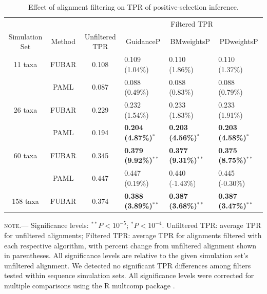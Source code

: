 \documentclass[11pt]{article}
\begin{document}
\begin{table}
\caption {\label{tab:casemodel} Effect of alignment filtering on TPR of positive-selection inference.}
\begin{tabular}{c c c l l l}
\hline\noalign{\smallskip}
& & & \multicolumn{3}{c}{Filtered TPR} \\
\cline{4-6}\noalign{\smallskip}
Simulation Set & Method & Unfiltered TPR & \multicolumn{1}{c}{GuidanceP} & \multicolumn{1}{c}{BMweightsP} & \multicolumn{1}{c}{PDweightsP} \\ 
\hline\noalign{\smallskip}
11 taxa  & FUBAR & 0.108 & 0.109  (1.04\%)   & 0.110  (1.86\%)  & 0.110  (1.37\%)        \\
              & PAML &  0.087 & 0.088  (0.49\%) &  0.088  (0.83\%)   & 0.088  (0.79\%)        \\
\hline
26 taxa   & FUBAR &  0.229 & 0.232 (1.54\%)  & 0.233 (1.83\%) & 0.233 (1.91\%)         \\
              & PAML & 0.194 & \textbf{0.204 (4.87\%)}$^{\ast}$ & \textbf{0.203 (4.56\%)}$^{\ast}$ & \textbf{0.203 (4.58\%)}$^{\ast}$   \\
\hline
60 taxa  & FUBAR & 0.345 & \textbf{0.379 (9.92\%)}$^{\ast\ast}$ & \textbf{0.377 (9.31\%)}$^{\ast\ast}$ & \textbf{0.375 (8.75\%)}$^{\ast\ast}$  \\
              & PAML & 0.447 & 0.447 (0.19\%) & 0.440 (-1.43\%) & 0.445 (-0.30\%) \\
\hline
158 taxa & FUBAR & 0.374 & \textbf{0.388 (3.89\%)}$^{\ast\ast}$ & \textbf{0.387 (3.68\%)}$^{\ast\ast}$ & \textbf{0.387 (3.47\%)}$^{\ast\ast}$  \\
\hline
\end{tabular}
\newline
\textsc{note.}--- Significance levels: $^{\ast\ast} P < 10^{-5}$; $^{\ast} P < 10^{-4}$. Unfiltered TPR: average TPR for unfiltered alignments; Filtered TPR: average TPR for alignments filtered with each respective algorithm, with percent change from unfiltered alignment shown in parentheses. All significance levels are relative to the given simulation set's unfiltered alignment. We detected no significant TPR differences among filters tested within sequence simulation sets. All significance levels were corrected for multiple comparisons using the R multcomp package \citep{Hothorn2008}.
\end{table}

\newpage
\end{document}
